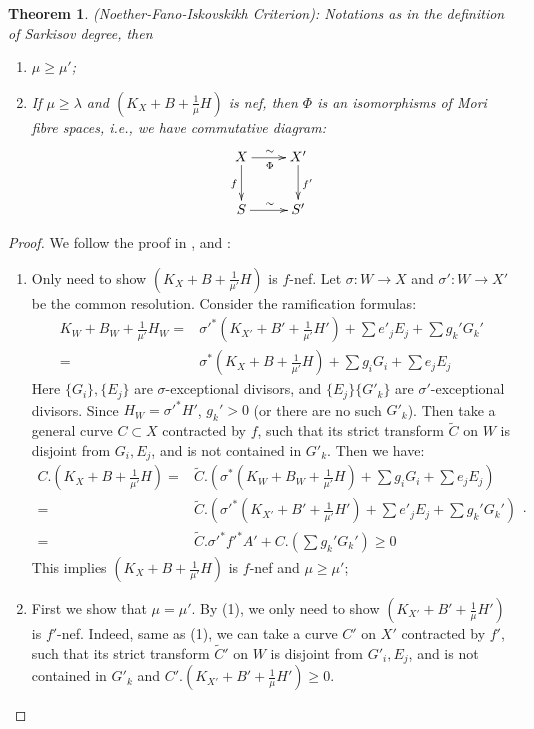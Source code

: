 \documentclass[11pt]{amsart}
\newtheorem{thm}[defn]{Theorem}
\begin{document}
\begin{thm}\label{nfi}
  (Noether-Fano-Iskovskikh Criterion): Notations as in the definition of Sarkisov degree, then 
  \begin{enumerate}
    \item $ \mu\geqslant \mu' $;
    \item If $ \mu \geqslant \lambda $ and $ (K_X+B+\frac{1}{\mu} H) $ is nef, then $\Phi$ is an isomorphisms of Mori fibre spaces, i.e., we have commutative diagram: 
      \[ \xymatrix{
          X\ar[r]^\sim_\Phi\ar[d]_f&X'\ar[d]^{f'}\\
      S\ar[r]^\sim& S' } \]
  \end{enumerate}
\end{thm}

\begin{proof}
  We follow the proof in \cite{haconMinimalModelProgram2012},\cite{liuSarkisovProgramGeneralized2021} and \cite{cortiFactoringBirationalMaps}:
  \begin{enumerate}
    \item Only need to show $ (K_X+B+\frac{1}{\mu'}H) $ is $ f $-nef.   Let $\sigma:W\to X$ and $\sigma':W\to X'$ be the common resolution. Consider the ramification formulas:
      \[
        \begin{aligned}  
          K_W+B_W+\frac{1}{\mu'}H_W=&\sigma'^*(K_{X'}+B'+\frac{1}{\mu'}H')+\sum e'_jE_j+ \sum g_k'G_k'\\
          =&\sigma^*(K_{X}+B+\frac{1}{\mu'}H)+\sum g_iG_i+\sum e_jE_j
        \end{aligned}
      \]
      Here $ \{G_i\}, \{E_j\} $ are $ \sigma $-exceptional divisors, and $ \{E_j\}\{G'_k\} $ are $ \sigma' $-exceptional divisors. Since $H_W=\sigma'^*H' $, $ g_k'>0 $ (or there are no such $ G'_k $). Then take a general curve $ C\subset X $ contracted by $ f $, such that its strict transform $ \tilde{C} $ on $ W $ is disjoint from $ G_i, E_j $, and is not contained in $ G'_k $. Then we have:
      \[
        \begin{aligned}
          C.\left(K_X+B+\frac{1}{\mu'}H\right)=&\tilde{C}.\left(\sigma^*\left(K_W+B_{W}+\frac{1}{\mu'}H\right)+\sum g_iG_i+\sum e_jE_j\right)\\
          =&\tilde{C}.\left(\sigma'^*\left(K_{X'}+B'+\frac{1}{\mu'}H'\right)+\sum e'_jE_j+ \sum g_k'G_k'\right)\\
          =&\tilde{C}.\sigma'^*f'^*A'+C.\left(\sum g_k'G_k'\right) \geqslant0
        \end{aligned}
      .\]
     This implies $ (K_X+B+\frac{1}{\mu'}H) $ is $ f $-nef and $ \mu\geqslant \mu' $;
   \item  First we show that $ \mu=\mu' $. By (1), we only need to show $ (K_{X'}+B'+\frac{1}{\mu}H') $ is $ f' $-nef. Indeed,  same as (1), we can take a curve $ C' $ on $X'$ contracted by $f'$, such that its strict transform $\tilde{C}'$ on $W$ is disjoint from  $ G'_i, E_j $, and is not contained in $ G'_k $ and 
     $C'.\left(K_{X'}+B'+\frac{1}{\mu}H'\right)\geqslant 0$.


\end{enumerate}
\end{proof}
\end{document}
